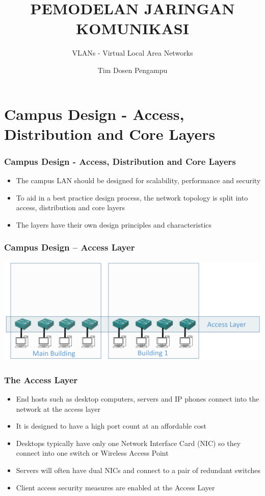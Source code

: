 \documentclass[pdflatex,compress,mathserif]{beamer}
\title{PEMODELAN JARINGAN KOMUNIKASI}
\subtitle{VLANs - Virtual Local Area Networks}
\author{Tim Dosen Pengampu}
\begin{document}
	
\maketitle

\section{Campus Design - Access, Distribution and Core Layers}

\begin{frame}
	\frametitle{Campus Design - Access, Distribution and Core Layers}
	\begin{itemize}
		\item The campus LAN should be designed for scalability, performance and
security
		\item To aid in a best practice design process, the network topology is split
into access, distribution and core layers
		\item The layers have their own design principles and characteristics
	\end{itemize}
\end{frame}

\begin{frame}
	\frametitle{Campus Design – Access Layer}
	\begin{center}
		\includegraphics[width=\linewidth]{img/img01}
	\end{center}
\end{frame}

\begin{frame}
	\frametitle{The Access Layer}
	\begin{itemize}
		\item End hosts such as desktop computers, servers and IP phones connect
into the network at the access layer
		\item It is designed to have a high port count at an affordable cost
		\item Desktops typically have only one Network Interface Card (NIC) so they
connect into one switch or Wireless Access Point
		\item Servers will often have dual NICs and connect to a pair of redundant
switches
		\item Client access security measures are enabled at the Access Layer
	\end{itemize}
\end{frame}
\end{document}
